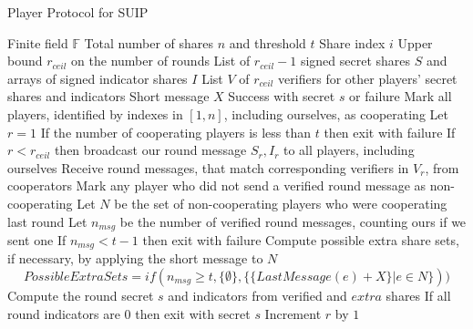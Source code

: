 \documentclass{dalcsthesis}
\begin{document}
\begin{algorithm}
  \caption{Player Protocol for SUIP}
  \label{alg:SUIP:Player}
  \begin{algorithmic}
    \INPUT Finite field $\mathbb{F}$
    \INPUT Total number of shares $n$ and threshold $t$
    \INPUT Share index $i$
    \INPUT Upper bound $r_{ceil}$ on the number of rounds
    \INPUT List of $r_{ceil}-1$ signed secret shares $S$ and arrays of signed indicator shares $I$
    \INPUT List $V$ of $r_{ceil}$ verifiers for other players' secret shares and indicators
    \INPUT Short message $X$
    \OUTPUT Success with secret $s$ or failure
    \STATE Mark all players, identified by indexes in $[1, n]$, including ourselves, as cooperating
    \STATE Let $r = 1$
      \STATE If the number of cooperating players is less than $t$ then exit with failure
      \STATE If $r < r_{ceil}$ then broadcast our round message $S_r, I_r$ to all players, including ourselves
      \STATE Receive round messages, that match corresponding verifiers in $V_r$, from cooperators
      \STATE Mark any player who did not send a verified round message as non-cooperating
      \STATE Let $N$ be the set of non-cooperating players who were cooperating last round
      \STATE Let $n_{msg}$ be the number of verified round messages, counting ours if we sent one
      \STATE If $n_{msg} < t - 1$ then exit with failure
      \STATE Compute possible extra share sets, if necessary, by applying the short message to $N$
      		$$PossibleExtraSets = if(n_{msg} \geq t, \{\emptyset\}, \{\{LastMessage(e) + X\} | e \in N\}))$$
        \STATE Compute the round secret $s$ and indicators from verified and $extra$ shares
        \STATE If all round indicators are 0 then exit with secret $s$
      \ENDFOR
      \STATE Increment $r$ by $1$
    \ENDWHILE
  \end{algorithmic}
\end{algorithm}
\end{document}
